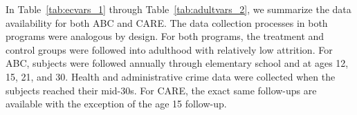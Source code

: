 \begin{appendices}
In Table~\ref{tab:ecvars_1} through Table~\ref{tab:adultvars_2}, we summarize the data availability for both ABC and CARE. The data collection processes in both programs were analogous by design. For both programs, the treatment and control groups were followed into adulthood with relatively low attrition. For ABC, subjects were followed annually through elementary school and at ages 12, 15, 21, and 30. Health and administrative crime data were collected when the subjects reached their mid-30s. For CARE, the exact same follow-ups are available with the exception of the age 15 follow-up.\\

\end{appendices}
